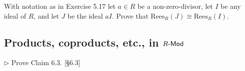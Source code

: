\begin{problem}
	With notation as in Exercise 5.17 let $a \in R$ be a non-zero-divisor, let $I$ be any ideal of $R$, and let $J$ be the ideal $aI$. Prove that $\text{Rees}_R(J) \cong \text{Rees}_R(I)$.
\end{problem}

\begin{solution}
\end{solution}

\subsection{Products, coproducts, etc., in $R\text{-}\mathsf{Mod}$}

\begin{problem}
	$\triangleright$ Prove Claim 6.3. [\S 6.3]
\end{problem}

